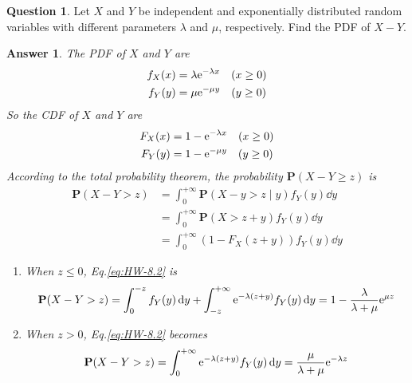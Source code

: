 \documentclass[utf8]{article}
\theoremstyle{definition}%
\newtheorem{question}{Question} %
\theoremstyle{plain}%
\newtheorem{answer}{Answer} %
\begin{document}
\begin{question}
    Let $X$ and $Y$ be independent and exponentially distributed random variables with different parameters $\lambda$ and $\mu$, respectively. Find the PDF of $X - Y$.
\end{question}
\begin{answer}
    The PDF of $X$ and $Y$ are
    \begin{equation}
    \begin{aligned}
        f_{X}(x) &= \lambda \mathrm{e}^{-\lambda x} \quad (x \geq 0) \\
        f_{Y}(y) &= \mu \mathrm{e}^{-\mu y} \quad (y \geq 0)
    \end{aligned}
    \end{equation}
    So the CDF of $X$ and $Y$ are
    \begin{equation}
    \begin{aligned}
        F_{X}(x) &= 1 - \mathrm{e}^{-\lambda x} \quad (x \geq 0) \\
        F_{Y}(y) &= 1 - \mathrm{e}^{-\mu y} \quad (y \geq 0)
    \end{aligned}
    \end{equation}
    According to the total probability theorem, the probability $\mathbf{P}(X - Y \geq z)$ is
    \begin{equation}
    \begin{aligned}
        \label{eq:HW-8.2}
        \mathbf{P}(X - Y > z) &= \int_{0}^{+\infty} \mathbf{P}(X - y > z \mid y) f_{Y}(y) \dd{y} \\ 
        &= \int_{0}^{+\infty} \mathbf{P}(X > z + y) f_{Y}(y) \dd{y} \\
        &= \int_{0}^{+\infty} \left(1 - F_{X}(z + y)\right) f_{Y}(y) \dd{y} 
    \end{aligned}
    \end{equation}
    \begin{enumerate}[label=(\alph*)]
        \item When $z \leq 0$, Eq.\ref{eq:HW-8.2} is
            \begin{equation}
                \mathbf{P}(X - Y > z) = \int_{0}^{-z} f_{Y}(y) \dd{y} + \int_{-z}^{+\infty} \mathrm{e}^{-\lambda (z + y)} f_{Y}(y) \dd{y} = 1 - \frac{\lambda}{\lambda + \mu} \mathrm{e}^{\mu z}
            \end{equation}
        \item When $z > 0$, Eq.\ref{eq:HW-8.2} becomes
            \begin{equation}
                \mathbf{P}(X - Y > z) = \int_{0}^{+\infty} \e^{-\lambda (z + y)} f_{Y}(y) \dd{y} = \frac{\mu}{\lambda + \mu} \e^{-\lambda z}

\end{equation}
\end{enumerate}
\end{answer}
\end{document}
